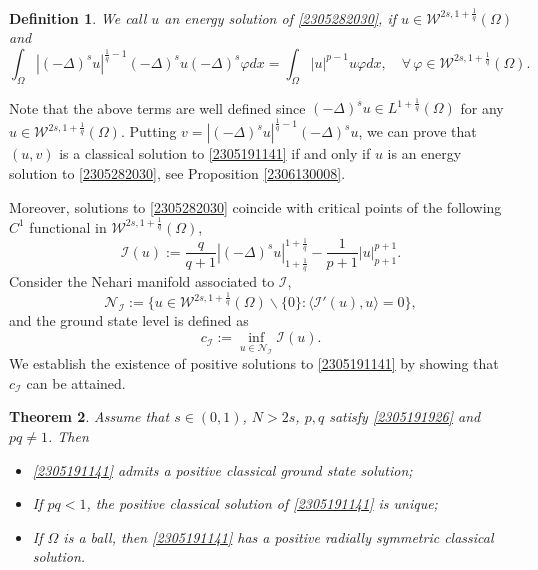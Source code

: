\documentclass[10pt]{article}
\numberwithin{equation}{section}
\newtheorem{theorem}{Theorem}[section]
\newtheorem{definition}[theorem]{Definition}
\numberwithin{equation}{section}
\begin{document}
\begin{definition}
\label{fenergysol}
We call $u$ an energy solution of \eqref{2305282030}, if $u\in \mathcal{W}^{2s, 1+\frac1q}(\Omega)$ and
\begin{equation}\label{2305282038}
\int_{\Omega}|(-\Delta)^{s}u|^{\frac1q-1}(-\Delta)^{s}u(-\Delta)^{s}\varphi dx=\int_{\Omega}|u|^{p-1}u\varphi dx,\quad \forall\,\varphi\in \mathcal{W}^{2s, 1+\frac1q}(\Omega).
\end{equation}
\end{definition}
Note that the above terms are well defined since $(-\Delta)^{s}u\in L^{1+\frac{1}{q}}(\Omega)$ for any $u\in \mathcal{W}^{2s, 1+\frac1q}(\Omega)$. Putting $v=|(-\Delta)^{s}u|^{\frac1q-1}(-\Delta)^{s}u$, we can prove that $(u, v)$ is a classical solution to \eqref{2305191141} if and only if $u$ is an energy solution to \eqref{2305282030}, see Proposition \ref{2306130008}.

Moreover, solutions to \eqref{2305282030} coincide with critical points of the following $C^1$ functional in $\mathcal{W}^{2s, 1+\frac1q}(\Omega)$,
\[
\mathcal{I}(u) :=\frac{q}{q+1}\left|(-\Delta)^su\right|_{1+\frac1q}^{1+\frac1q}-\frac1{p+1}|u|_{p+1}^{p+1}.
\]
Consider the Nehari manifold associated to $\mathcal{I}$,
\begin{equation}\label{2406220952}
\mathcal{N}_{\mathcal{I}}:=\{u\in \mathcal{W}^{2s, 1+\frac1q}(\Omega)\backslash \{0\}: \langle \mathcal{I}'(u), u\rangle=0\},
\end{equation}
and the ground state level is defined as 
\begin{equation}\label{2306152335}
c_{\mathcal{I}}:=\underset{u\in \mathcal{N}_{\mathcal{I}}}{\inf}\mathcal{I}(u).
\end{equation}
We establish the existence of positive solutions to \eqref{2305191141} by showing that $c_{\mathcal{I}}$ can be attained. %
\begin{theorem}\label{2306122224}
Assume that $s\in (0, 1)$, $N>2s$, $p, q$ satisfy \eqref{2305191926} and $pq\neq 1$. Then
\begin{itemize}
\item[\rm (i)] \eqref{2305191141} admits a positive classical ground state solution;
\item[\rm (ii)] If $pq<1$, the positive classical solution of \eqref{2305191141} is unique;
\item[\rm (iii)] If $\Omega$ is a ball, then \eqref{2305191141} has a positive radially symmetric classical solution.
\end{itemize}
\end{theorem}
\end{document}

